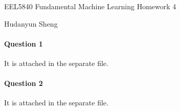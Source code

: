 \documentclass[a4paper]{article}
\begin{document}
\begin{spacing}{2.0}
\begin{flushleft}\begin{huge}EEL5840 Fundamental Machine Learning   Homework 4\end{huge}\end{flushleft}
\begin{flushright}\begin{Large} Hudanyun Sheng \end{Large}\end{flushright}



\paragraph{\huge\textbf{ Question 1\\} }
\normalsize
It is attached in the separate file.
\paragraph{\huge\textbf{ Question 2\\} }
\normalsize
It is attached in the separate file.


\end{spacing}
\end{document}
